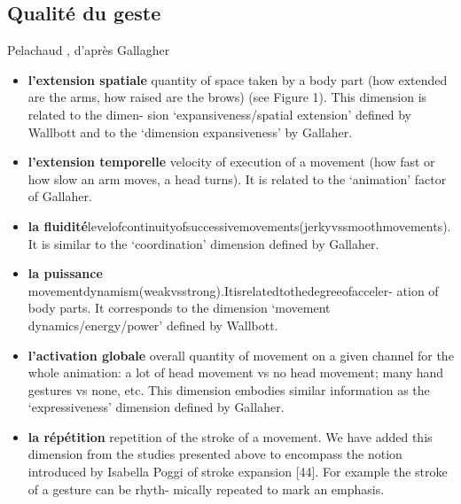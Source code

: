 \subsection{Qualité du geste}
Pelachaud \cite{pelachaud_studies_2009}, d'après Gallagher \cite{gallaher_individual_1992}
\vspace{-1em}
\begin{itemize}[noitemsep]
	\item \textbf{l'extension spatiale} quantity of space taken by a body part (how extended are the arms, how raised are the brows) (see Figure 1). This dimension is related to the dimen- sion ‘expansiveness/spatial extension’ defined by Wallbott and to the ‘dimension expansiveness’ by Gallaher.
	\item \textbf{l'extension temporelle} velocity of execution of a movement (how fast or how slow an arm moves, a head turns). It is related to the ‘animation’ factor of Gallaher.
	\item \textbf{la fluidité}levelofcontinuityofsuccessivemovements(jerkyvssmoothmovements). It is similar to the ‘coordination’ dimension defined by Gallaher.
	\item \textbf{la puissance} movementdynamism(weakvsstrong).Itisrelatedtothedegreeofacceler- ation of body parts. It corresponds to the dimension ‘movement dynamics/energy/power’ defined by Wallbott.
	\item \textbf{l'activation globale} overall quantity of movement on a given channel for the whole animation: a lot of head movement vs no head movement; many hand gestures vs none, etc. This dimension embodies similar information as the ‘expressiveness’ dimension defined by Gallaher.
	\item \textbf{la répétition} repetition of the stroke of a movement. We have added this dimension from the studies presented above to encompass the notion introduced by Isabella Poggi of stroke expansion [44]. For example the stroke of a gesture can be rhyth- mically repeated to mark an emphasis.
\end{itemize}